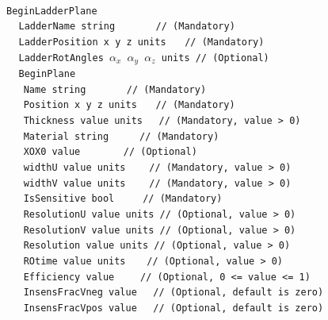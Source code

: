 ~\\
\noindent
{\tt BeginLadderPlane} \\
$~~~~~${\tt LadderName       string                   $~~~~~~~~~~~~$   // (Mandatory)} \\
$~~~~~${\tt LadderPosition   x  y  z units                     $~~~$   // (Mandatory)} \\
$~~~~~${\tt LadderRotAngles  $\alpha_x$  $\alpha_y$  $\alpha_z$ units  // (Optional)}  \\
$~~~~~${\tt BeginPlane} \\
$~~~~~~~${\tt Name             string                   $~~~~~~~~~~~~$   // (Mandatory)} \\
$~~~~~~~${\tt Position         x  y  z units                     $~~~$   // (Mandatory)} \\
$~~~~~~~${\tt Thickness        value  units                       $~~$   // (Mandatory, value > 0)} \\
$~~~~~~~${\tt Material         string                       $~~~~~~~~$   // (Mandatory)} \\
$~~~~~~~${\tt XOX0             value                   $~~~~~~~~~~~~~$   // (Optional)}  \\
$~~~~~~~${\tt widthU           value units                     $~~~~~$   // (Mandatory, value > 0)} \\
$~~~~~~~${\tt widthV           value units                     $~~~~~$   // (Mandatory, value > 0)} \\
$~~~~~~~${\tt IsSensitive      bool                          $~~~~~~~$   // (Mandatory)} \\
$~~~~~~~${\tt ResolutionU      value units                               // (Optional, value > 0)} \\
$~~~~~~~${\tt ResolutionV      value units                               // (Optional, value > 0)} \\
$~~~~~~~${\tt Resolution       value units                               // (Optional, value > 0)} \\
$~~~~~~~${\tt ROtime           value units                      $~~~~$   // (Optional, value > 0)} \\
$~~~~~~~${\tt Efficiency       value                          $~~~~~~$   // (Optional, 0 <= value <= 1)} \\
$~~~~~~~${\tt InsensFracVneg   value                              $~~$   // (Optional, default is zero)} \\
$~~~~~~~${\tt InsensFracVpos   value                              $~~$   // (Optional, default is zero)} \\
